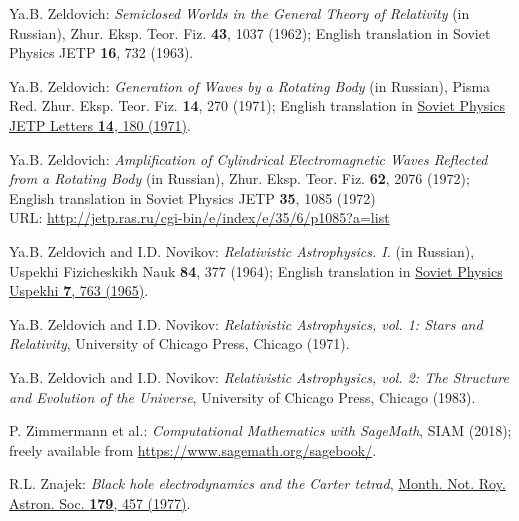 \begin{thebibliography}{123}

Ya.B. Zeldovich:
{\em Semiclosed Worlds in the General Theory of Relativity} (in Russian),
Zhur. Eksp. Teor. Fiz. {\bf 43}, 1037 (1962); English translation in
Soviet Physics JETP {\bf 16}, 732 (1963).

Ya.B. Zeldovich:
{\em Generation of Waves by a Rotating Body} (in Russian),
Pisma Red. Zhur. Eksp. Teor. Fiz. {\bf 14}, 270 (1971); English translation in
\href{http://jetpletters.ru/ps/0/article_24607.shtml}{Soviet Physics JETP Letters {\bf 14}, 180 (1971)}.

Ya.B. Zeldovich:
{\em Amplification of Cylindrical Electromagnetic Waves Reflected from a Rotating Body} (in Russian),
Zhur. Eksp. Teor. Fiz. {\bf 62}, 2076 (1972); English translation in
Soviet Physics JETP {\bf 35}, 1085 (1972)\\
URL: \url{http://jetp.ras.ru/cgi-bin/e/index/e/35/6/p1085?a=list}

Ya.B. Zeldovich and I.D. Novikov:
{\em Relativistic Astrophysics. I.} (in Russian),
Uspekhi Fizicheskikh Nauk {\bf 84}, 377 (1964);
English translation in \href{https://doi.org/10.1070/PU1965v007n06ABEH003683}{Soviet Physics Uspekhi {\bf 7}, 763 (1965)}.

Ya.B. Zeldovich and I.D. Novikov:
{\em Relativistic Astrophysics, vol. 1: Stars and Relativity},
University of Chicago Press, Chicago (1971).

Ya.B. Zeldovich and I.D. Novikov:
{\em Relativistic Astrophysics, vol. 2: The Structure and Evolution of the Universe},
University of Chicago Press, Chicago (1983).

P. Zimmermann et al.: {\em Computational Mathematics with SageMath}, SIAM (2018);
freely available from \url{https://www.sagemath.org/sagebook/}.

R.L. Znajek:
{\em Black hole electrodynamics and the Carter tetrad},
\href{https://doi.org/10.1093/mnras/179.3.457}{Month. Not. Roy. Astron. Soc. {\bf 179}, 457 (1977)}.

\end{thebibliography}
